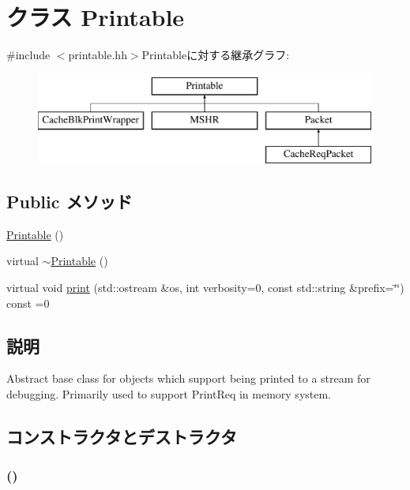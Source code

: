 \hypertarget{classPrintable}{
\section{クラス Printable}
\label{classPrintable}
}


{\ttfamily \#include $<$printable.hh$>$}Printableに対する継承グラフ:\begin{figure}[H]
\begin{center}
\leavevmode
\includegraphics[height=3cm]{classPrintable}
\end{center}
\end{figure}
\subsection*{Public メソッド}
\begin{DoxyCompactItemize}
\item 
\hyperlink{classPrintable_a182a8146d47e9a1c76b35183fcb20ad8}{Printable} ()
\item 
virtual \hyperlink{classPrintable_a8ce398facea289d7575cd064db1b5d9b}{$\sim$Printable} ()
\item 
virtual void \hyperlink{classPrintable_a3be2c5a60e9670becc3259fc689833c5}{print} (std::ostream \&os, int verbosity=0, const std::string \&prefix=\char`\"{}\char`\"{}) const =0
\end{DoxyCompactItemize}


\subsection{説明}
Abstract base class for objects which support being printed to a stream for debugging. Primarily used to support PrintReq in memory system. 

\subsection{コンストラクタとデストラクタ}
\hypertarget{classPrintable_a182a8146d47e9a1c76b35183fcb20ad8}{
\subsubsection[{Printable}]{ ()}}
\label{classPrintable_a182a8146d47e9a1c76b35183fcb20ad8}



